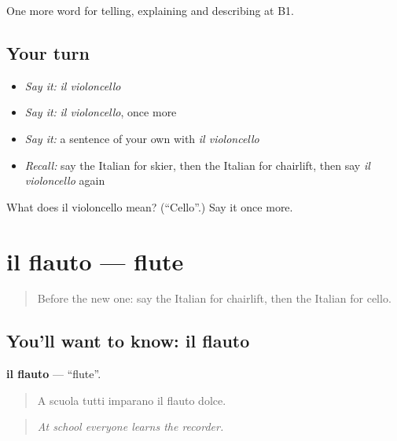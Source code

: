 \begin{grammarlens}[title={What you've built}]
One more word for telling, explaining and describing at B1.
\end{grammarlens}

\subsection*{Your turn}
\begin{itemize}
\raggedright
  \item \emph{Say it:} \emph{il violoncello}
  \item \emph{Say it:} \emph{il violoncello}, once more
  \item \emph{Say it:} a sentence of your own with \emph{il violoncello}
  \item \emph{Recall:} say the Italian for skier, then the Italian for chairlift, then say \emph{il violoncello} again
\end{itemize}

\begin{tcolorbox}[breakable,colback=teal!4,colframe=teal!35!black,title={Before you move on}]
What does il violoncello mean? (\textquotedblleft{}Cello\textquotedblright{}.) Say it once more.
\end{tcolorbox}
\section[il flauto]{il flauto — flute}

\label{lesson:IT-C516-flauto}



\begin{quote}
Before the new one: say the Italian for chairlift, then the Italian for cello.
\end{quote}

\subsection*{You'll want to know: il flauto}
\textbf{il flauto} — \textquotedblleft{}flute\textquotedblright{}.

\begin{quote}
A scuola tutti imparano il flauto dolce.
\end{quote}

\begin{quote}
\emph{At school everyone learns the recorder.}
\end{quote}

